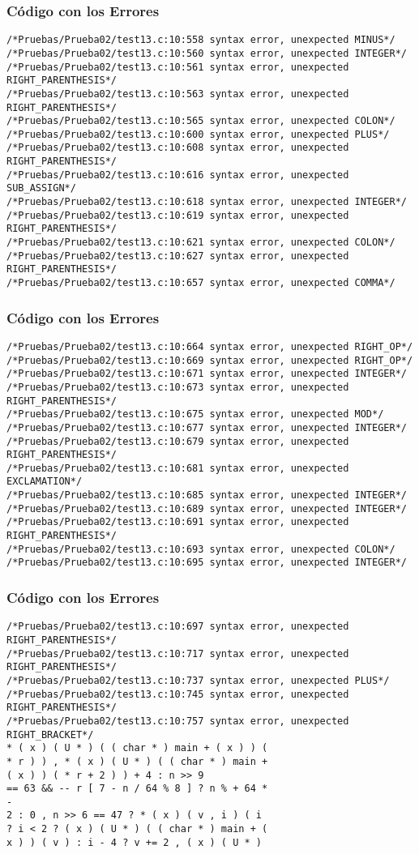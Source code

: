 \documentclass{beamer}
\begin{document}
\begin{frame}[fragile]
\frametitle{C\'odigo con los Errores}
\begin{verbatim}
/*Pruebas/Prueba02/test13.c:10:558 syntax error, unexpected MINUS*/
/*Pruebas/Prueba02/test13.c:10:560 syntax error, unexpected INTEGER*/
/*Pruebas/Prueba02/test13.c:10:561 syntax error, unexpected RIGHT_PARENTHESIS*/
/*Pruebas/Prueba02/test13.c:10:563 syntax error, unexpected RIGHT_PARENTHESIS*/
/*Pruebas/Prueba02/test13.c:10:565 syntax error, unexpected COLON*/
/*Pruebas/Prueba02/test13.c:10:600 syntax error, unexpected PLUS*/
/*Pruebas/Prueba02/test13.c:10:608 syntax error, unexpected RIGHT_PARENTHESIS*/
/*Pruebas/Prueba02/test13.c:10:616 syntax error, unexpected SUB_ASSIGN*/
/*Pruebas/Prueba02/test13.c:10:618 syntax error, unexpected INTEGER*/
/*Pruebas/Prueba02/test13.c:10:619 syntax error, unexpected RIGHT_PARENTHESIS*/
/*Pruebas/Prueba02/test13.c:10:621 syntax error, unexpected COLON*/
/*Pruebas/Prueba02/test13.c:10:627 syntax error, unexpected RIGHT_PARENTHESIS*/
/*Pruebas/Prueba02/test13.c:10:657 syntax error, unexpected COMMA*/
\end{verbatim}
\end{frame}
\begin{frame}[fragile]
\frametitle{C\'odigo con los Errores}
\begin{verbatim}
/*Pruebas/Prueba02/test13.c:10:664 syntax error, unexpected RIGHT_OP*/
/*Pruebas/Prueba02/test13.c:10:669 syntax error, unexpected RIGHT_OP*/
/*Pruebas/Prueba02/test13.c:10:671 syntax error, unexpected INTEGER*/
/*Pruebas/Prueba02/test13.c:10:673 syntax error, unexpected RIGHT_PARENTHESIS*/
/*Pruebas/Prueba02/test13.c:10:675 syntax error, unexpected MOD*/
/*Pruebas/Prueba02/test13.c:10:677 syntax error, unexpected INTEGER*/
/*Pruebas/Prueba02/test13.c:10:679 syntax error, unexpected RIGHT_PARENTHESIS*/
/*Pruebas/Prueba02/test13.c:10:681 syntax error, unexpected EXCLAMATION*/
/*Pruebas/Prueba02/test13.c:10:685 syntax error, unexpected INTEGER*/
/*Pruebas/Prueba02/test13.c:10:689 syntax error, unexpected INTEGER*/
/*Pruebas/Prueba02/test13.c:10:691 syntax error, unexpected RIGHT_PARENTHESIS*/
/*Pruebas/Prueba02/test13.c:10:693 syntax error, unexpected COLON*/
/*Pruebas/Prueba02/test13.c:10:695 syntax error, unexpected INTEGER*/
\end{verbatim}
\end{frame}
\begin{frame}[fragile]
\frametitle{C\'odigo con los Errores}
\begin{verbatim}
/*Pruebas/Prueba02/test13.c:10:697 syntax error, unexpected RIGHT_PARENTHESIS*/
/*Pruebas/Prueba02/test13.c:10:717 syntax error, unexpected RIGHT_PARENTHESIS*/
/*Pruebas/Prueba02/test13.c:10:737 syntax error, unexpected PLUS*/
/*Pruebas/Prueba02/test13.c:10:745 syntax error, unexpected RIGHT_PARENTHESIS*/
/*Pruebas/Prueba02/test13.c:10:757 syntax error, unexpected RIGHT_BRACKET*/
* ( x ) ( U * ) ( ( char * ) main + ( x ) ) ( 
* r ) ) , * ( x ) ( U * ) ( ( char * ) main + 
( x ) ) ( * r + 2 ) ) + 4 : n >> 9 
== 63 && -- r [ 7 - n / 64 % 8 ] ? n % + 64 * 
- 
2 : 0 , n >> 6 == 47 ? * ( x ) ( v , i ) ( i 
? i < 2 ? ( x ) ( U * ) ( ( char * ) main + ( 
x ) ) ( v ) : i - 4 ? v += 2 , ( x ) ( U * ) 
\end{verbatim}
\end{frame}
\end{document}
